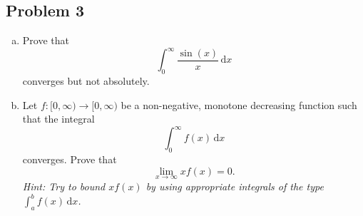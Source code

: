 \documentclass[12pt]{article}
\newcommand{\ita}[1]{\textit{#1}}
\renewcommand{\i}[4]{\int_{#1}^{#2} {#3} \, \mathrm{d} {#4} }
\theoremstyle{definition}
\begin{document}
\subsection{Problem 3 \texorpdfstring{\cite{Christian,Zach,Aryabhata}}{}}
\begin{enumerate}[(a)]
    \item Prove that 
    \[
        \i{0}{\infty}{ \frac{\sin(x)}{x} }{x}
    \]
    converges but not absolutely. 
    \item Let $f : [0,\infty) \to [0,\infty)$ be a non-negative, monotone decreasing function such that the integral 
    \[
        \i{0}{\infty}{f(x)}{x}
    \]
    converges. Prove that 
    \[
        \lim\limits_{x \to \infty} x f(x) = 0.
    \]
    \ita{Hint: Try to bound $x f(x)$ by using appropriate integrals of the type $\i{a}{b}{f(x)}{x}$.}
\end{enumerate}
\end{document}
